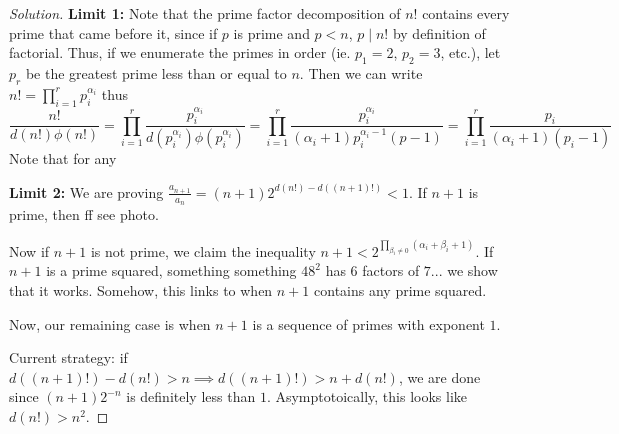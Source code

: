 \documentclass{article}
\begin{document}
\begin{proof}[Solution]
	\hfill\break
	\textbf{Limit 1:}
	Note that the prime factor decomposition of $n!$
	contains every prime that came before it,
	since if $p$ is prime and $p < n$,
	$p \mid n!$ by definition of factorial.
	Thus, if we enumerate the primes in order (ie. $p_1 = 2$, $p_2 = 3$, etc.),
	let $p_r$ be the greatest prime less than or equal to $n$.
	Then we can write $n! = \prod_{i=1}^r p_i^{\alpha_i}$ thus
	\[
		\frac{n!}{d(n!)\phi(n!)} =
		\prod_{i=1}^r \frac{p_i^{\alpha_i}}{d(p_i^{\alpha_i})\phi(p_i^{\alpha_i})}
		= \prod_{i=1}^r \frac{p_i^{\alpha_i}}{(\alpha_i+1)p_i^{\alpha_i-1}(p-1)}
		= \prod_{i=1}^r \frac{p_i}{(\alpha_i+1)(p_i-1)}
	\]
	Note that for any 

	\hfill \break
	\noindent\textbf{Limit 2:}
	We are proving $\frac{a_{n+1}}{a_n} = (n+1)2^{d(n!) - d((n+1)!)} < 1$.
	If $n+1$ is prime,
	then ff see photo.

	Now if $n+1$ is not prime,
	we claim the inequality $n+1 < 2^{\prod_{\beta_i \neq 0}(\alpha_i + \beta_i + 1)}$.
	If $n+1$ is a prime squared,
	something something $48^2$ has $6$ factors of $7$...
	we show that it works.
	Somehow, this links to when $n+1$ contains any prime squared.

	Now, our remaining case is when $n+1$ is a sequence of primes with exponent $1$.

	Current strategy:
	if $d((n+1)!) - d(n!) > n \implies d((n+1)!) > n + d(n!)$,
	we are done since $(n+1)2^{-n}$ is definitely less than $1$.
	Asymptotoically, this looks like $d(n!) > n^2$.
\end{proof}
\end{document}
